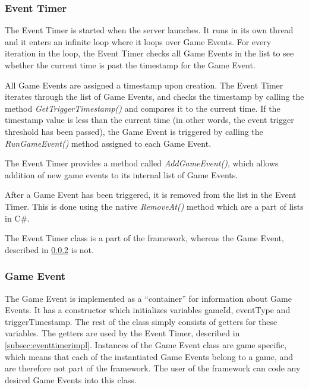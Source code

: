\subsubsection{Event Timer}
\label{sec:eventtimerimpl}
The Event Timer is started when the server launches. It runs in its own thread and it enters an infinite loop where it loops over Game Events. For every iteration in the loop, the Event Timer checks all Game Events in the list to see whether the current time is past the timestamp for the Game Event. 

All Game Events are assigned a timestamp upon creation. The Event Timer iterates through the list of Game Events, and checks the timestamp by calling the method \textit{GetTriggerTimestamp()} and compares it to the current time. If the timestamp value is less than the current time (in other words, the event trigger threshold has been passed), the Game Event is triggered by calling the \textit{RunGameEvent()} method assigned to each Game Event. 

The Event Timer provides a method called \textit{AddGameEvent()}, which allows addition of new game events to its internal list of Game Events.

After a Game Event has been triggered, it is removed from the list in the Event Timer. This is done using the native \textit{RemoveAt()} method which are a part of lists in C\#.

The Event Timer class is a part of the framework, whereas the Game Event, described in \cref{subsec:geventImpl} is not.

\subsubsection{Game Event}\label{subsec:geventImpl}
The Game Event is implemented as a ``container'' for information about Game Events. It has a constructor which initializes variables gameId, eventType and triggerTimestamp. The rest of the class simply consists of getters for these variables. The getters are used by the Event Timer, described in \cref{subsec:eventtimerimpl}. Instances of the Game Event class are game specific, which means that each of the instantiated Game Events belong to a game, and are therefore not part of the framework. The user of the framework can code any desired Game Events into this class.